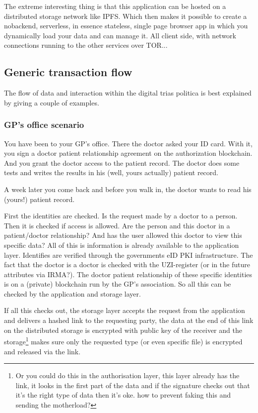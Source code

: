 \documentclass{article}
\begin{document}
The extreme interesting thing is that this application can be hosted on a distributed storage network like IPFS. Which then makes it possible to create a nobackend, serverless, in essence stateless, single page browser app in which you dynamically load your data and can manage it. All client side, with network connections running to the other services over TOR...


\subsection{Generic transaction flow}
The flow of data and interaction within the digital trias politica is best explained by giving a couple of examples.

\subsubsection{GP's office scenario}
You have been to your GP's office. There the doctor asked your ID card. With it, you sign a doctor patient relationship agreement on the authorization blockchain. And you grant the doctor access to the patient record. The doctor does some tests and writes the results in his (well, yours actually) patient record.

A week later you come back and before you walk in, the doctor wants to read his (yours!) patient record.

First the identities are checked. Is the request made by a doctor to a person. Then it is checked if access is allowed. Are the person and this doctor in a patient/doctor relationship? And has the user allowed this doctor to view this specific data? All of this is information is already available to the application layer. Identifies are verified through the governments eID PKI infrastructure. The fact that the doctor is a doctor is checked with the UZI-register (or in the future attributes via IRMA?). The doctor patient relationship of these specific identities is on a (private) blockchain run by the GP's association. So all this can be checked by the application and storage layer.

If all this checks out, the storage layer accepts the request from the application and delivers a hashed link to the requesting party, the data at the end of this link on the distributed storage is encrypted with public key of the receiver and the storage\footnote{Or you could do this in the authorisation layer, this layer already has the link, it looks in the first part of the data and if the signature checks out that it's the right type of data then it's oke. how to prevent faking this and sending the motherload?} makes sure only the requested type (or even specific file) is encrypted and released via the link.
\end{document}
